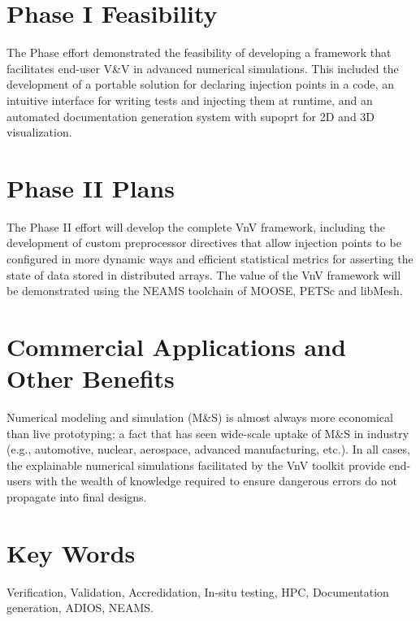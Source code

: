 \section*{Phase I Feasibility}
The Phase effort demonstrated the feasibility of developing a framework that facilitates end-user V\&V
in advanced numerical simulations. This included the development of 
a portable solution for declaring injection points in a code, an intuitive interface 
for writing tests and injecting them at runtime, and an automated documentation generation
system with supoprt for 2D and 3D visualization. 

\section*{Phase II Plans}
The Phase II effort will develop the complete VnV framework, including the development
of custom preprocessor directives that allow injection points to be configured in more dynamic ways 
and efficient statistical metrics for asserting the state of data 
stored in distributed arrays. The value of the VnV framework will be demonstrated using the NEAMS 
toolchain of MOOSE, PETSc and libMesh. 

\section*{Commercial Applications and Other Benefits}
Numerical modeling and simulation (M\&S) is almost always more economical than live prototyping; 
a fact that has seen wide-scale uptake of M\&S in industry (e.g., automotive, nuclear, 
aerospace, advanced manufacturing, etc.). In all cases, the explainable numerical simulations facilitated
by the VnV toolkit provide end-users with the wealth of knowledge required to ensure dangerous errors
do not propagate into final designs. 

\section*{Key Words}
Verification, Validation, Accredidation, In-situ testing,
HPC, Documentation generation, ADIOS, NEAMS.

